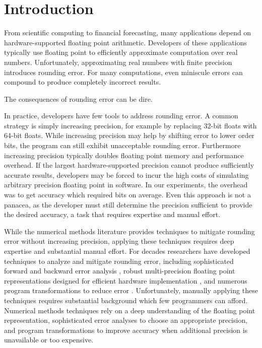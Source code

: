\documentclass[paper.tex]{subfiles}
\begin{document}
\section{Introduction}
\label{sec:introduction}

From scientific computing to financial forecasting, many applications
depend on hardware-supported floating point arithmetic. Developers of
these applications typically use floating point to efficiently
approximate computation over real numbers.  Unfortunately,
approximating real numbers with finite precision introduces rounding
error.  For many computations, even miniscule errors can compound to
produce completely incorrect results.

The consequences of rounding error can be dire. 

In practice, developers have few tools to address rounding error.  A
common strategy is simply increasing precision, for example by
replacing 32-bit floats with 64-bit floats.  While increasing
precision may help by shifting error to lower order bits, the program
can still exhibit unacceptable rounding error.  Furthermore increasing
precision typically doubles floating point memory and performance
overhead. If the largest hardware-supported precision cannot produce
sufficiently accurate results, developers may be forced to incur the
high costs of simulating arbitrary precision floating point in
software.  In our experiments, the overhead was 
to get  accuracy which required  bits on
average. Even this approach is not a panacea, as the developer must
still determine the precision sufficient to provide the desired
accuracy, a task that requires expertise and manual effort.

While the numerical methods literature provides techniques to mitigate
rounding error without increasing precision, applying these techniques
requires deep expertise and substantial manual effort.  For decades
researchers have developed techniques to analyze and mitigate rounding
error, including sophisticated forward and backward error analysis
, robust multi-precision floating point representations
designed for efficient hardware implementation , and
numerous program transformations to reduce error .
Unfortunately, manually applying these techniques requires substantial
background which few programmers can afford.  Numerical methods
techniques rely on a deep understanding of the floating point
representation, sophisticated error analyses to choose an appropriate
precision, and program transformations to improve accuracy when
additional precision is unavailable or too expensive.
\end{document}
